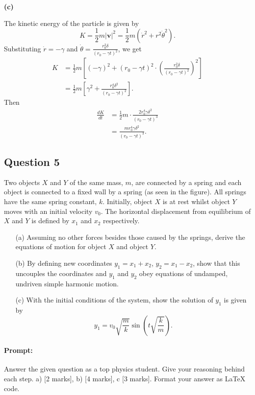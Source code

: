 \documentclass{article}
\begin{document}
\textbf{(c)} 

The kinetic energy of the particle is given by
\[
K = \frac{1}{2} m |\mathbf{v}|^2 = \frac{1}{2} m (\dot{r}^2 + r^2 \dot{\theta}^2).
\]
Substituting $\dot{r} = -\gamma$ and $\dot{\theta} = \frac{r_0^2 \delta}{(r_0 - \gamma t)^2}$, we get
\begin{align*}
K &= \frac{1}{2} m \left[ (-\gamma)^2 + (r_0 - \gamma t)^2 \cdot \left( \frac{r_0^2 \delta}{(r_0 - \gamma t)^2} \right)^2 \right] \\
&= \frac{1}{2} m \left[ \gamma^2 + \frac{r_0^4 \delta^2}{(r_0 - \gamma t)^2} \right].
\end{align*}
Then
\begin{align*}
\frac{dK}{dt} &= \frac{1}{2} m \cdot \frac{2 r_0^4 \gamma \delta^2}{(r_0 - \gamma t)^3} \\
&= \boxed{\frac{m r_0^4 \gamma \delta^2}{(r_0 - \gamma t)^3}}.
\end{align*}

\subsection{Question 5}

Two objects $X$ and $Y$ of the same mass, $m$, are connected by a spring and each object is connected to a fixed wall by a spring (as seen in the figure). All springs have the same spring constant, $k$. Initially, object $X$ is at rest whilst object $Y$ moves with an initial velocity $v_0$. The horizontal displacement from equilibrium of $X$ and $Y$ is defined by $x_1$ and $x_2$ respectively.

\begin{enumerate}
    \item[(a)] Assuming no other forces besides those caused by the springs, derive the equations of motion for object $X$ and object $Y$.
    \item[(b)] By defining new coordinates $y_1 = x_1 + x_2$, $y_2 = x_1 - x_2$, show that this uncouples the coordinates and $y_1$ and $y_2$ obey equations of undamped, undriven simple harmonic motion.
    \item[(c)] With the initial conditions of the system, show the solution of $y_1$ is given by
    \[
    y_1 = v_0 \sqrt{\frac{m}{k}} \sin\left(t \sqrt{\frac{k}{m}}\right).
    \]
\end{enumerate}

\paragraph{Prompt: \\} 
Answer the given question as a top physics student. Give your reasoning behind each step. a) [2 marks], b) [4 marks], c [3 marks].
Format your answer as LaTeX code.
\end{document}
